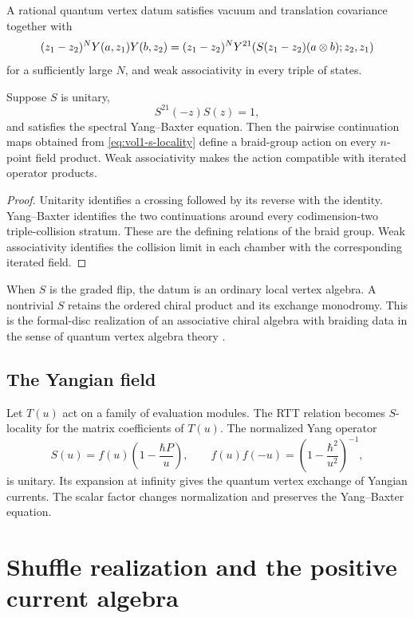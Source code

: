 \begin{definition}
A rational quantum vertex datum satisfies vacuum and translation covariance together with
\begin{equation}\label{eq:vol1-s-locality}
 (z_1-z_2)^N Y(a,z_1)Y(b,z_2)
 =(z_1-z_2)^N
 Y^{21}\!\left(S(z_1-z_2)(a\otimes b);z_2,z_1\right)
\end{equation}
for a sufficiently large $N$, and weak associativity in every triple of states.
\end{definition}

\begin{theorem}
Suppose $S$ is unitary,
\[
 S^{21}(-z)S(z)=1,
\]
and satisfies the spectral Yang--Baxter equation.  Then the pairwise continuation maps obtained from \eqref{eq:vol1-s-locality} define a braid-group action on every $n$-point field product.  Weak associativity makes the action compatible with iterated operator products.
\end{theorem}
\begin{proof}
Unitarity identifies a crossing followed by its reverse with the identity.  Yang--Baxter identifies the two continuations around every codimension-two triple-collision stratum.  These are the defining relations of the braid group.  Weak associativity identifies the collision limit in each chamber with the corresponding iterated field.
\end{proof}

When $S$ is the graded flip, the datum is an ordinary local vertex algebra.  A nontrivial $S$ retains the ordered chiral product and its exchange monodromy.  This is the formal-disc realization of an associative chiral algebra with braiding data in the sense of quantum vertex algebra theory \cite{LiNonlocal,LiQVA}.

\section{The Yangian field}
Let $T(u)$ act on a family of evaluation modules.  The RTT relation becomes $S$-locality for the matrix coefficients of $T(u)$.  The normalized Yang operator
\[
 S(u)=f(u)\left(1-\frac{\hbar P}{u}\right),
 \qquad
 f(u)f(-u)=\left(1-\frac{\hbar^2}{u^2}\right)^{-1},
\]
is unitary.  Its expansion at infinity gives the quantum vertex exchange of Yangian currents.  The scalar factor changes normalization and preserves the Yang--Baxter equation.

\chapter{Shuffle realization and the positive current algebra}
